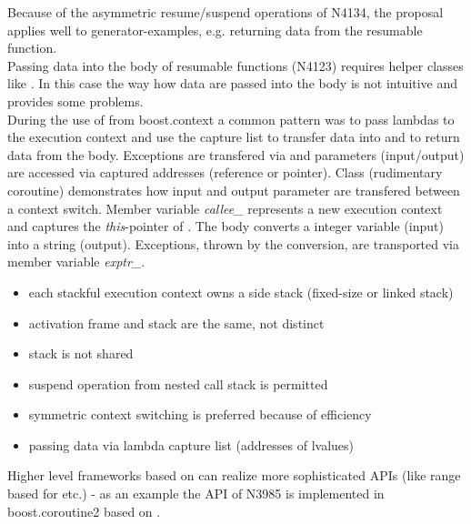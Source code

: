 Because of the asymmetric resume/suspend operations of N4134, the proposal
applies well to generator-examples, e.g. returning data from the resumable
function.\\
\newline
Passing data into the body of resumable functions (N4123) requires helper
classes like \channel.
In this case the way how data are passed into the body is not intuitive and
provides some problems.\\
\newline
During the use of  from boost.context\cite{bcontext} a
common pattern was to pass lambdas to the execution context and use the capture
list to transfer data into and to return data from the body. Exceptions are
transfered via \excpt and parameters (input/output) are accessed
via captured addresses (reference or pointer).
Class  (rudimentary coroutine) demonstrates how input and output
parameter are transfered between a context switch. Member variable
\emph{callee\_} represents a new execution context and captures the
\emph{this}-pointer of . The body converts a integer variable (input)
into a string (output). Exceptions, thrown by the conversion, are transported
via member variable \emph{exptr\_}.

\begin{itemize}
    \item   each stackful execution context owns a side stack (fixed-size or
            linked stack)
    \item   activation frame and stack are the same, not distinct
    \item   stack is not shared
    \item   suspend operation from nested call stack is permitted
    \item   symmetric context switching is preferred because of efficiency
    \item   passing data via lambda capture list (addresses of lvalues)
\end{itemize}
Higher level frameworks based on \ectx can realize more sophisticated APIs
(like range based for etc.) - as an example the API of N3985\cite{N3985} is
implemented in boost.coroutine2\cite{bcoroutine2} based on
.
